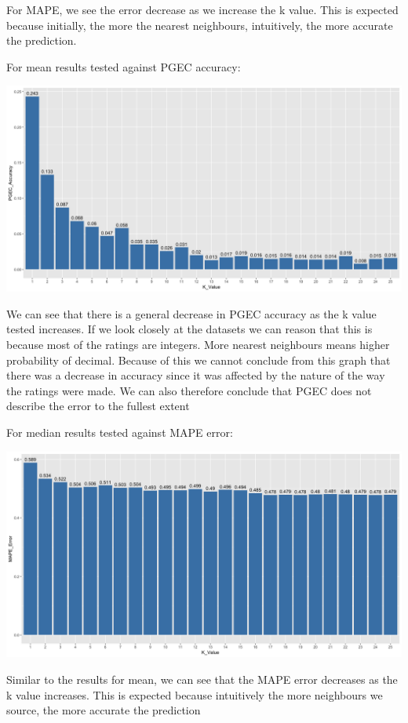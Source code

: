 \documentclass{article}
\begin{document}
For MAPE, we see the error decrease as we increase the k value. This is expected because initially, the more the nearest neighbours, intuitively, the more accurate the prediction.

For mean results tested against PGEC accuracy:

\includegraphics[scale=0.25]{Mean-PGEC.png}

We can see that there is a general decrease in PGEC accuracy as the k value tested increases. If we look closely at the datasets we can reason that this is because most of the ratings are integers. More nearest neighbours means higher probability of decimal. Because of this we cannot conclude from this graph that there was a decrease in accuracy since it was affected by the nature of the way the ratings were made. We can also therefore conclude that PGEC does not describe the error to the fullest extent

For median results tested against MAPE error:

\includegraphics[scale=0.25]{Median-MAPE.png}

Similar to the results for mean, we can see that the MAPE error decreases as the k value increases. This is expected because intuitively the more neighbours we source, the more accurate the prediction
\end{document}
